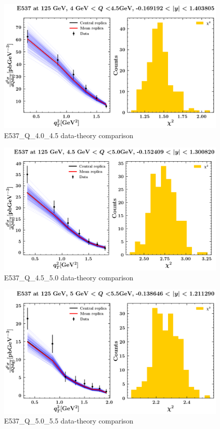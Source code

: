 \documentclass[]{article}
\begin{document}
\begin{figure}
\centering
\includegraphics{pngplots/E537_Q_4.0_4.5.png}
\caption{E537\_Q\_4.0\_4.5 data-theory comparison}
\end{figure}

\begin{figure}
\centering
\includegraphics{pngplots/E537_Q_4.5_5.0.png}
\caption{E537\_Q\_4.5\_5.0 data-theory comparison}
\end{figure}

\begin{figure}
\centering
\includegraphics{pngplots/E537_Q_5.0_5.5.png}
\caption{E537\_Q\_5.0\_5.5 data-theory comparison}
\end{figure}
\end{document}
